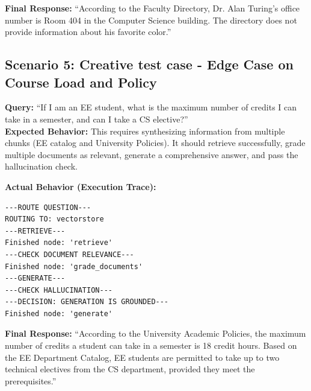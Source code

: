 \documentclass[12pt,a4paper]{article}
\begin{document}
\textbf{Final Response:}
``According to the Faculty Directory, Dr. Alan Turing's office number is Room 404 in the Computer Science building. The directory does not provide information about his favorite color.''

\subsection{Scenario 5: Creative test case - Edge Case on Course Load and Policy}
\textbf{Query:} ``If I am an EE student, what is the maximum number of credits I can take in a semester, and can I take a CS elective?''\\
\textbf{Expected Behavior:} This requires synthesizing information from multiple chunks (EE catalog and University Policies). It should retrieve successfully, grade multiple documents as relevant, generate a comprehensive answer, and pass the hallucination check.

\textbf{Actual Behavior (Execution Trace):}
\begin{lstlisting}
---ROUTE QUESTION---
ROUTING TO: vectorstore
---RETRIEVE---
Finished node: 'retrieve'
---CHECK DOCUMENT RELEVANCE---
Finished node: 'grade_documents'
---GENERATE---
---CHECK HALLUCINATION---
---DECISION: GENERATION IS GROUNDED---
Finished node: 'generate'
\end{lstlisting}

\textbf{Final Response:}
``According to the University Academic Policies, the maximum number of credits a student can take in a semester is 18 credit hours. Based on the EE Department Catalog, EE students are permitted to take up to two technical electives from the CS department, provided they meet the prerequisites.''
\end{document}
